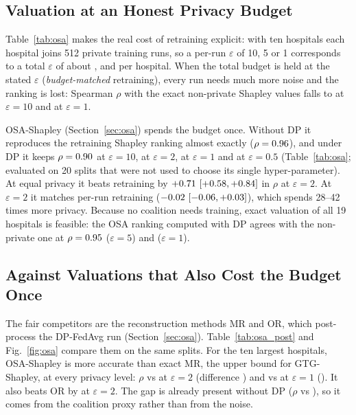 \subsection{Valuation at an Honest Privacy Budget}
\label{sec:p19_osa}
Table~\ref{tab:osa} makes the real cost of retraining explicit: with ten hospitals each hospital joins 512 private training runs, so a per-run $\varepsilon$ of 10, 5 or 1 corresponds to a total $\varepsilon$ of about \trueEpsTen{}, \trueEpsFive{} and \trueEpsOne{} per hospital. When the total budget is held at the stated $\varepsilon$ (\emph{budget-matched} retraining), every run needs much more noise and the ranking is lost: Spearman $\rho$ with the exact non-private Shapley values falls to \bmRhoTen{} at $\varepsilon=10$ and \bmRhoOne{} at $\varepsilon=1$.

OSA-Shapley (Section~\ref{sec:osa}) spends the budget once. Without DP it reproduces the retraining Shapley ranking almost exactly ($\rho=0.96$), and under DP it keeps $\rho=0.90$ at $\varepsilon=10$, \osaRhoTwo{} at $\varepsilon=2$, \osaRhoOne{} at $\varepsilon=1$ and \osaRhoHalf{} at $\varepsilon=0.5$ (Table~\ref{tab:osa}; evaluated on 20 splits that were not used to choose its single hyper-parameter). At equal privacy it beats retraining by $+0.71\ [+0.58, +0.84]$ in $\rho$ at $\varepsilon=2$. At $\varepsilon=2$ it matches per-run retraining ($-0.02\ [-0.06, +0.03]$), which spends 28--42 times more privacy. Because no coalition needs training, exact valuation of all 19 hospitals is feasible: the OSA ranking computed with DP agrees with the non-private one at $\rho=0.95$ ($\varepsilon=5$) and \osaNineRhoOne{} ($\varepsilon=1$).


\subsection{Against Valuations that Also Cost the Budget Once}
\label{sec:p19_post}
The fair competitors are the reconstruction methods MR and OR, which post-process the DP-FedAvg run (Section~\ref{sec:osa}). Table~\ref{tab:osa_post} and Fig.~\ref{fig:osa} compare them on the same splits. For the ten largest hospitals, OSA-Shapley is more accurate than exact MR, the upper bound for GTG-Shapley, at every privacy level: $\rho$ \osaRhoTwo{} vs \mrRhoTwo{} at $\varepsilon=2$ (difference \osaVsMrTwo) and \osaRhoOne{} vs \mrRhoOne{} at $\varepsilon=1$ (\osaVsMrOne). It also beats OR by \osaVsOrTwo{} at $\varepsilon=2$. The gap is already present without DP ($\rho$ \osaNoDP{} vs \mrRhoNoDP), so it comes from the coalition proxy rather than from the noise.



